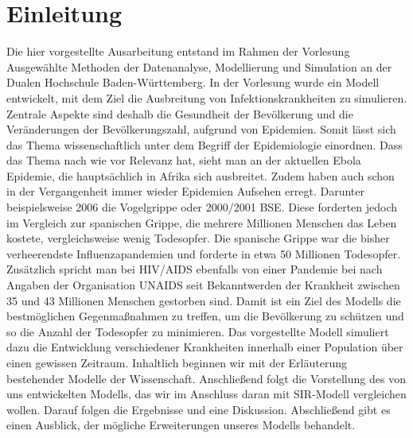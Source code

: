 \section*{Einleitung}

Die hier vorgestellte Ausarbeitung entstand im Rahmen der Vorlesung \glqq Ausgewählte Methoden der Datenanalyse, Modellierung und Simulation\grqq\; an der Dualen Hochschule Baden-Württemberg.
In der Vorlesung wurde ein Modell entwickelt, mit dem Ziel die Ausbreitung von Infektionskrankheiten zu simulieren.
Zentrale Aspekte sind deshalb die Gesundheit der Bevölkerung und die Veränderungen der Bevölkerungszahl, aufgrund von Epidemien. Somit lässt sich das Thema wissenschaftlich unter dem Begriff der Epidemiologie einordnen.
Dass das Thema nach wie vor Relevanz hat, sieht man an der aktuellen Ebola Epidemie, die hauptsächlich in Afrika sich ausbreitet. Zudem haben auch schon in der Vergangenheit immer wieder Epidemien Aufsehen erregt. Darunter beispielsweise 2006 die Vogelgrippe\cite{gehlhoff2007chronik}
oder 2000/2001 BSE\cite{Spon:2014}. Diese forderten jedoch im Vergleich zur spanischen Grippe, die mehrere Millionen Menschen das Leben kostete, vergleichsweise wenig Todesopfer. Die spanische Grippe war die bisher verheerendste Influenzapandemien und forderte in etwa 50 Millionen Todesopfer\cite{welt:2014}. Zusätzlich spricht man bei HIV/AIDS ebenfalls von einer Pandemie bei nach Angaben der Organisation UNAIDS seit Bekanntwerden der Krankheit zwischen 35 und 43 Millionen Menschen gestorben sind\cite{UNAIDS:2014}.
Damit ist ein Ziel des Modells die bestmöglichen Gegenmaßnahmen zu treffen, um die Bevölkerung zu schützen und so die Anzahl der Todesopfer zu minimieren.
Das vorgestellte Modell simuliert dazu die Entwicklung verschiedener Krankheiten innerhalb einer Population über einen gewissen Zeitraum. 
Inhaltlich beginnen wir mit der Erläuterung bestehender Modelle der Wissenschaft. Anschließend folgt die Vorstellung des von uns entwickelten Modells, das wir im Anschluss daran mit SIR-Modell vergleichen wollen. Darauf folgen die Ergebnisse und eine Diskussion. Abschließend gibt es einen Ausblick, der mögliche Erweiterungen unseres Modells behandelt. 

